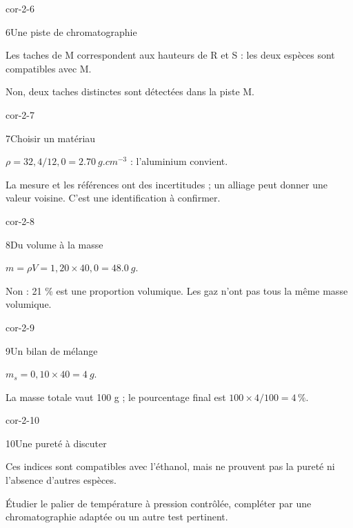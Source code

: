 \begin{blocLivre}{cor-2-6}\begin{corrige}{6}{Une piste de chromatographie}
\begin{questions}
\item Les taches de M correspondent aux hauteurs de R et S : les deux espèces sont compatibles avec M.
\item Non, deux taches distinctes sont détectées dans la piste M.
\end{questions}
\end{corrige}\end{blocLivre}
\begin{blocLivre}{cor-2-7}\begin{corrige}{7}{Choisir un matériau}
\begin{questions}
\item $\rho=32,4/12,0=\qty{2,70}{g.cm^{-3}}$ : l’aluminium convient.
\item La mesure et les références ont des incertitudes ; un alliage peut donner une valeur voisine. C’est une identification à confirmer.
\end{questions}
\end{corrige}\end{blocLivre}
\begin{blocLivre}{cor-2-8}\begin{corrige}{8}{Du volume à la masse}
\begin{questions}
\item $m=\rho V=1,20\times40,0=\qty{48,0}{g}$.
\item Non : 21 \% est une proportion volumique. Les gaz n’ont pas tous la même masse volumique.
\end{questions}
\end{corrige}\end{blocLivre}
\begin{blocLivre}{cor-2-9}\begin{corrige}{9}{Un bilan de mélange}
\begin{questions}
\item $m_s=0,10\times40=\qty{4}{g}$.
\item La masse totale vaut 100 g ; le pourcentage final est $100\times4/100=4\,\%$.
\end{questions}
\end{corrige}\end{blocLivre}
\clearpage
\begin{blocLivre}{cor-2-10}\begin{corrige}{10}{Une pureté à discuter}
\begin{questions}
\item Ces indices sont compatibles avec l’éthanol, mais ne prouvent pas la pureté ni l’absence d’autres espèces.
\item Étudier le palier de température à pression contrôlée, compléter par une chromatographie adaptée ou un autre test pertinent.
\end{questions}
\end{corrige}\end{blocLivre}
